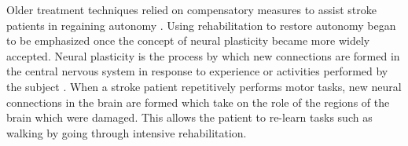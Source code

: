 \documentclass[12pt]{report}
\begin{document}

Older treatment techniques relied on compensatory measures to assist stroke patients in regaining autonomy \cite{Dobkin2004}. Using rehabilitation to restore autonomy began to be emphasized once the concept of neural plasticity became more widely accepted. Neural plasticity is the process by which new connections are formed in the central nervous system in response to experience or activities performed by the subject \cite{Warraich2010}. When a stroke patient repetitively performs motor tasks, new neural connections in the brain are formed which take on the role of the regions of the brain which were damaged. This allows the patient to re-learn tasks such as walking by going through intensive rehabilitation. 

\end{document}
